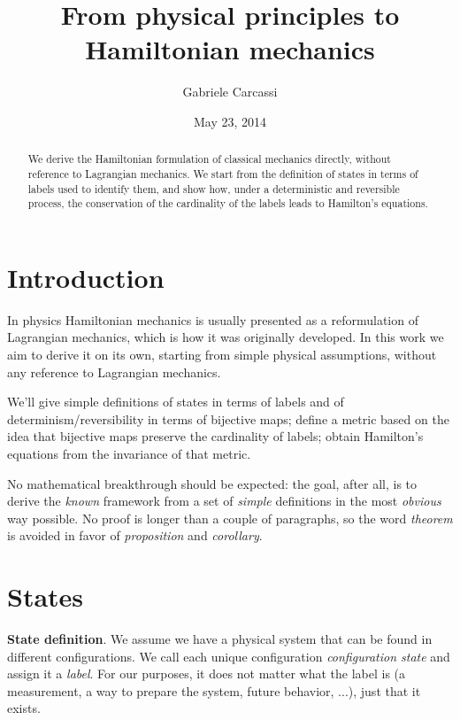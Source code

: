 \documentclass[twocolumn,floatfix,nofootinbib]{revtex4}   %
\theoremstyle{theorem}
\theoremstyle{definition}
\begin{document}
\title{From physical principles to Hamiltonian mechanics}
\author{Gabriele Carcassi}
\date{May 23, 2014}

\begin{abstract}
We derive the Hamiltonian formulation of classical mechanics directly, without reference to Lagrangian mechanics.
We start from the definition of states in terms of labels used to identify them, and show how, under a deterministic and
reversible process, the conservation of the cardinality of the labels leads to Hamilton's equations.\end{abstract}

\maketitle

\section{Introduction}
In physics Hamiltonian mechanics is usually presented as a reformulation of Lagrangian mechanics, which is how it was originally developed. In this work we aim to derive it on its own, starting from simple physical assumptions, without any reference to Lagrangian mechanics.

We'll give simple definitions of states in terms of labels and of determinism/reversibility in terms of bijective maps; define a metric based on the idea that bijective maps preserve the cardinality of labels; obtain Hamilton's equations from the invariance of that metric.

No mathematical breakthrough should be expected: the goal, after all, is to derive the \emph{known} framework from a set of \emph{simple} definitions in the most \emph{obvious} way possible. No proof is longer than a couple of paragraphs, so the word \emph{theorem} is avoided in favor of \emph{proposition} and \emph{corollary}.

\section{States}
\textbf{State definition}. We assume we have a physical system that can be found in different configurations. We call each unique configuration \emph{configuration state} and assign it a \emph{label}. For our purposes, it does not matter what the label is (a measurement, a way to prepare the system, future behavior, ...), just that it exists.
\end{document}
